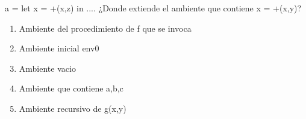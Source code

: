 {
 a =  let x = +(x,z) in .... ¿Donde extiende el ambiente que contiene x = +(x,y)?
\begin{enumerate}
	\item Ambiente del procedimiento de f que se invoca
	\item Ambiente inicial env0 %
	\item Ambiente vacio
	\item Ambiente que contiene a,b,c
	\item Ambiente recursivo de g(x,y)
\end{enumerate}
}
